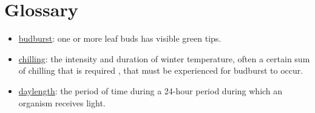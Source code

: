 \documentclass{article}
\begin{document}
\section* {Glossary}
\begin{itemize}
\item \underline{budburst}: one or more leaf buds has visible green tips. 
\item \underline{chilling}: the intensity and duration of winter temperature, often a certain sum of chilling that is required \citep[e.g., some amount of hours or days of cold temperatures, defined by a specific critical temperature or range of temperatures, such as between 0 and 7.2 \degree C,][]{richardson1974}, that must be experienced for budburst to occur.
\item \underline{daylength}: the period of time during a 24-hour period during which an organism receives light.


\end{itemize}
\end{document}
